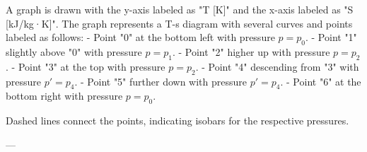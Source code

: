 A graph is drawn with the y-axis labeled as "T [K]" and the x-axis labeled as "S [kJ/kg·K]". The graph represents a T-s diagram with several curves and points labeled as follows:  
- Point "0" at the bottom left with pressure \( p = p_0 \).  
- Point "1" slightly above "0" with pressure \( p = p_1 \).  
- Point "2" higher up with pressure \( p = p_2 \).  
- Point "3" at the top with pressure \( p = p_2 \).  
- Point "4" descending from "3" with pressure \( p' = p_4 \).  
- Point "5" further down with pressure \( p' = p_4 \).  
- Point "6" at the bottom right with pressure \( p = p_0 \).  

Dashed lines connect the points, indicating isobars for the respective pressures.  

---
